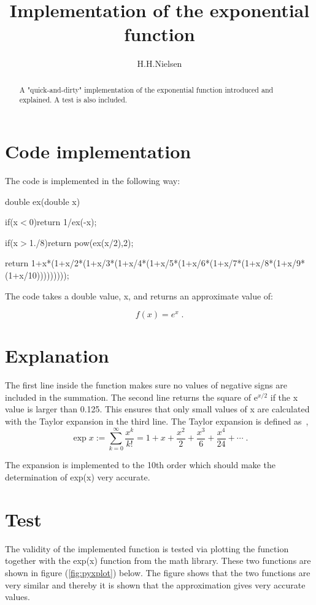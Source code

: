 \documentclass{article}
\title{Implementation of the exponential function}
\author{H.H.Nielsen}
\date{}
\begin{document}
\maketitle

\begin{abstract}
A "quick-and-dirty" implementation of the exponential function introduced
and explained. A test is also included.
\end{abstract}

\section{Code implementation}
The code is implemented in the following way:

	{double ex(double x)
		
	if(x$<$0)return 1/ex(-x);

	if(x$>$1./8)return pow(ex(x/2),2);

	return 1+x*(1+x/2*(1+x/3*(1+x/4*(1+x/5*(1+x/6*(1+x/7*(1+x/8*(1+x/9*(1+x/10)))))))));


The code takes a double value, x, and returns an approximate value of:

	\begin{equation}\label{eq:exp}
		f(x) = e^x \;.
	\end{equation}


\section{Explanation}
The first line inside the function makes sure no values of negative signs
are included in the summation. The second line returns the square of e$^{x/2}$ 
if the x value is larger than 0.125. This ensures that only small values of x
are calculated with the Taylor expansion in the third line.
The Taylor expansion is defined as~\cite{taylor},
	\begin{equation}\label{eq:nemes}
\exp x := \sum_{k = 0}^{\infty} \frac{x^k}{k!} = 1 + x + \frac{x^2}{2} + \frac{x^3}{6} + \frac{x^4}{24} + \cdots \;.
	\end{equation}

The expansion is implemented to the 10th order which should make the determination
of exp(x) very accurate.

\section{Test}
The validity of the implemented function is tested via plotting the function
together with the exp(x) function from the math library.
These two functions are shown in figure (\ref{fig:pyxplot}) below.
The figure shows that the two functions are very similar and thereby it is shown
that the approximation gives very accurate values.

}
\end{document}
